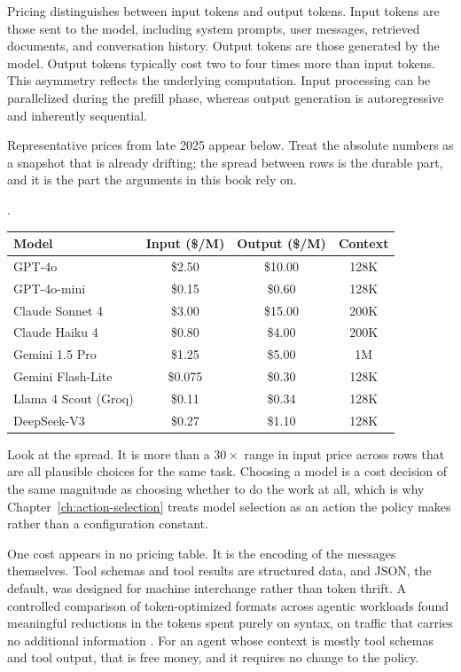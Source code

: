 Pricing distinguishes between input tokens and output tokens. Input tokens are those sent to the model, including system prompts, user messages, retrieved documents, and conversation history. Output tokens are those generated by the model. Output tokens typically cost two to four times more than input tokens. This asymmetry reflects the underlying computation. Input processing can be parallelized during the prefill phase, whereas output generation is autoregressive and inherently sequential.

Representative prices from late 2025 appear below. Treat the absolute numbers as a snapshot that is already drifting; the spread between rows is the durable part, and it is the part the arguments in this book rely on.

\begin{center}.
\begin{tabular}{lccc}
\toprule
Model & Input (\$/M) & Output (\$/M) & Context \\
\midrule
GPT-4o & \$2.50 & \$10.00 & 128K \\
GPT-4o-mini & \$0.15 & \$0.60 & 128K \\
Claude Sonnet 4 & \$3.00 & \$15.00 & 200K \\
Claude Haiku 4 & \$0.80 & \$4.00 & 200K \\
Gemini 1.5 Pro & \$1.25 & \$5.00 & 1M \\
Gemini Flash-Lite & \$0.075 & \$0.30 & 128K \\
Llama 4 Scout (Groq) & \$0.11 & \$0.34 & 128K \\
DeepSeek-V3 & \$0.27 & \$1.10 & 128K \\
\bottomrule
\end{tabular}
\end{center}

Look at the spread. It is more than a $30\times$ range in input price across rows that are all plausible choices for the same task. Choosing a model is a cost decision of the same magnitude as choosing whether to do the work at all, which is why Chapter~\ref{ch:action-selection} treats model selection as an action the policy makes rather than a configuration constant.

One cost appears in no pricing table. It is the encoding of the messages themselves. Tool schemas and tool results are structured data, and JSON, the default, was designed for machine interchange rather than token thrift. A controlled comparison of token-optimized formats across agentic workloads found meaningful reductions in the tokens spent purely on syntax, on traffic that carries no additional information \cite{notation2026}. For an agent whose context is mostly tool schemas and tool output, that is free money, and it requires no change to the policy.

